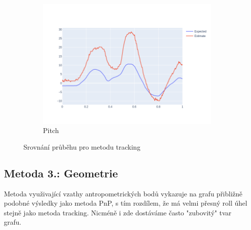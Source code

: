 \documentclass[12pt,a4paper,titlepage,final]{report}
\begin{document}
\begin{figure}[H]
\begin{subfigure}[b]{0.32\textwidth}
    \includegraphics[width=\textwidth]{images/evaluation/tracking_pitch_user_01_video_07.png}
   \caption{Pitch}
    \label{fig:track_pitch}
  \end{subfigure}
  \caption{Srovnání průběhu pro metodu tracking}
  \label{fig:track_graphs}
\end{figure}

\subsection{Metoda 3.: Geometrie}
Metoda využivající vzathy antropometrických bodů vykazuje na grafu přibližně podobné výsledky jako metoda PnP, s tím rozdílem, že má velmi přesný roll úhel stejně jako metoda tracking. Nicméně i zde dostáváme často "zubovitý" tvar grafu.
\end{document}
